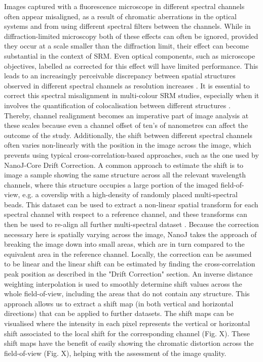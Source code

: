  Images captured with a fluorescence microscope in different spectral channels often appear misaligned, as a result of chromatic aberrations in the optical systems and from using different spectral filters between the channels. While in diffraction-limited microscopy both of these effects can often be ignored, provided they occur at a scale smaller than the diffraction limit, their effect can become substantial in the context of SRM. Even optical components, such as microscope objectives, labelled as corrected for this effect will have limited performance. This leads to an increasingly perceivable discrepancy between spatial structures observed in different spectral channels as resolution increases \cite{erdelyi2013correcting}. It is essential to correct this spectral misalignment in multi-colour SRM studies, especially when it involves the quantification of colocalisation between different structures \cite{bock2007two,van2009multicolor}. Thereby, channel realignment becomes an imperative part of image analysis at these scales because even a channel offset of ten's of nanometres can affect the outcome of the study. Additionally, the shift between different spectral channels often varies non-linearly with the position in the image across the image, which prevents using typical cross-correlation-based approaches, such as the one used by NanoJ-Core Drift Correction.
 A common approach to estimate the shift is to image a sample showing the same structure across all the relevant wavelength channels, where this structure occupies a large portion of the imaged field-of-view, e.g. a coverslip with a high-density of randomly placed multi-spectral beads. This dataset can be used to extract a non-linear spatial transform for each spectral channel with respect to a reference channel, and these transforms can then be used to re-align all further multi-spectral dataset \cite{arganda2006consistent,annibale2012identification}. Because the correction necessary here is spatially varying across the image, NanoJ takes the approach of breaking the image down into small areas, which are in turn compared to the equivalent area in the reference channel. Locally, the correction can be assumed to be linear and the linear shift can be estimated by finding the cross-correlation peak position as described in the "Drift Correction" section. An inverse distance weighting interpolation \cite{shepard1968two} is used to smoothly determine shift values across the whole field-of-view, including the areas that do not contain any structure. This approach allows us to extract a shift map (in both vertical and horizontal directions) that can be applied to further datasets. The shift maps can be visualised where the intensity in each pixel represents the vertical or horizontal shift associated to the local shift for the corresponding channel (Fig. X). These shift maps have the benefit of easily showing the chromatic distortion across the field-of-view (Fig. X), helping with the assessment of the image quality. 
 
